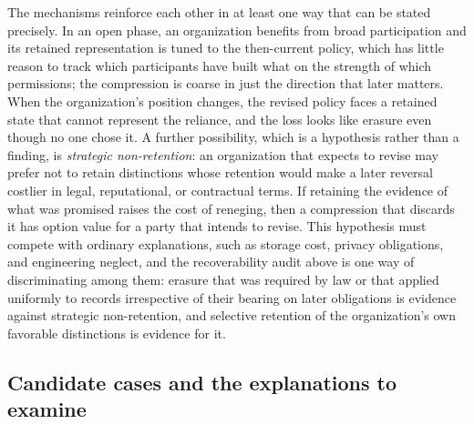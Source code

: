 \documentclass[11pt]{article}
\theoremstyle{definition}
\theoremstyle{remark}
\begin{document}
The mechanisms reinforce each other in at least one way that can be stated precisely. In an open phase, an organization benefits from broad participation and its retained representation is tuned to the then-current policy, which has little reason to track which participants have built what on the strength of which permissions; the compression is coarse in just the direction that later matters. When the organization's position changes, the revised policy faces a retained state that cannot represent the reliance, and the loss looks like erasure even though no one chose it. A further possibility, which is a hypothesis rather than a finding, is \emph{strategic non-retention}: an organization that expects to revise may prefer not to retain distinctions whose retention would make a later reversal costlier in legal, reputational, or contractual terms. If retaining the evidence of what was promised raises the cost of reneging, then a compression that discards it has option value for a party that intends to revise. This hypothesis must compete with ordinary explanations, such as storage cost, privacy obligations, and engineering neglect, and the recoverability audit above is one way of discriminating among them: erasure that was required by law or that applied uniformly to records irrespective of their bearing on later obligations is evidence against strategic non-retention, and selective retention of the organization's own favorable distinctions is evidence for it.

\subsection{Candidate cases and the explanations to examine}
\end{document}

